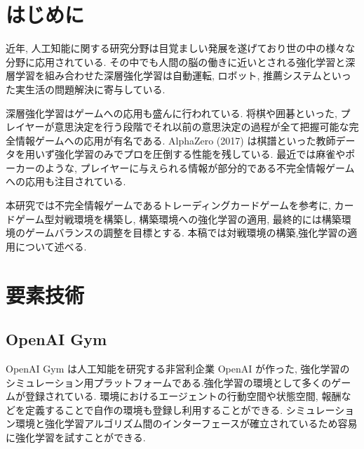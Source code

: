 \documentclass[twocolumn]{jarticle}     %
\begin{document}

\section{はじめに}
近年, 人工知能に関する研究分野は目覚ましい発展を遂げており世の中の様々な分野に応用されている. その中でも人間の脳の働きに近いとされる強化学習と深層学習を組み合わせた深層強化学習は自動運転, ロボット, 推薦システムといった実生活の問題解決に寄与している.\par
深層強化学習はゲームへの応用も盛んに行われている.
将棋や囲碁といった, プレイヤーが意思決定を行う段階でそれ以前の意思決定の過程が全て把握可能な完全情報ゲームへの応用が有名である. AlphaZero (2017) は棋譜といった教師データを用いず強化学習のみでプロを圧倒する性能を残している\cite{AlphaZero}. 最近では麻雀やポーカーのような, プレイヤーに与えられる情報が部分的である不完全情報ゲームへの応用も注目されている.
\par
本研究では不完全情報ゲームであるトレーディングカードゲームを参考に, カードゲーム型対戦環境を構築し, 構築環境への強化学習の適用, 最終的には構築環境のゲームバランスの調整を目標とする. 本稿では対戦環境の構築,強化学習の適用について述べる.

\section{要素技術}

\subsection{OpenAI Gym}
OpenAI Gym は人工知能を研究する非営利企業 OpenAI が作った, 強化学習のシミュレーション用プラットフォームである.強化学習の環境として多くのゲームが登録されている. 環境におけるエージェントの行動空間や状態空間, 報酬などを定義することで自作の環境も登録し利用することができる. シミュレーション環境と強化学習アルゴリズム間のインターフェースが確立されているため容易に強化学習を試すことができる.
\end{document}
